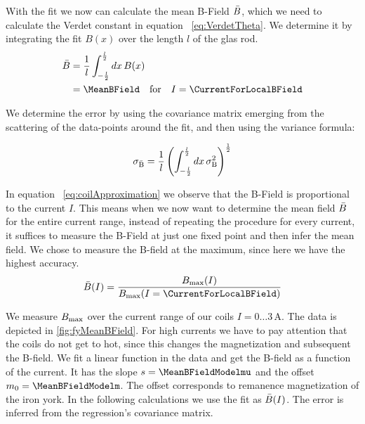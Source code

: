 \documentclass[a4paper,10pt,twocolumn]{article}
\newcommand{\unit}[1]{\, \mathrm{#1}}
\begin{document}
    \newcommand{\lHalf}{\frac{l}{2}}
    \newcommand{\xInteg}{\int_{-\lHalf}^{\lHalf} dx \,}

    With the fit we now can calculate the mean B-Field $\bar{B}$, which we need
    to calculate the Verdet constant in equation ~\eqref{eq:VerdetTheta}.
    We determine it by integrating the fit $B(x)$ over the length $l$ of the glas rod.
    \begin{align}
        \label{eq:meanBFieldInt}
        \BMean &= \frac{1}{l} \xInteg B(x) \\
            &= \MeanBField \quad \text{for} \quad I = \CurrentForLocalBField
    \end{align}

    We determine the error by using the covariance matrix emerging from the scattering of the
    data-points around the fit, and then using the variance formula:

    \begin{align*}
        \sigma_{\mathrm{\BMean}} = \frac{1}{l} \left( \xInteg \sigma_{\mathrm{B}}^2 \right)^{\frac{1}{2}}
    \end{align*}


    In equation ~\eqref{eq:coilApproximation} we observe that the B-Field is proportional to the
    current $I$.
    This means when we now want to determine the mean field $\bar{B}$ for the entire current range,
    instead of repeating the procedure for every current, it suffices to
    measure the B-Field at just one fixed point and then infer the mean field.
    We chose to measure the B-field at the maximum, since here we have the highest accuracy.
    \begin{align}
        \label{eq:meanBFromMaxB}
        \BMean (I) = \frac{\BMax(I)}{\BMax( I = \CurrentForLocalBField)}
    \end{align}

    We measure $B_{\mathrm{max}}$ over the current range of our coils $I = 0 \dots 3 \unit{A}$.
    The data is depicted in \autoref{fig:fyMeanBField}.
    For high currents we have to pay attention that the coils do not get to hot, since this changes
    the magnetization and subsequent the B-field.
    We fit a linear function in the data and get the B-field as a function of the current.
    It has the slope $s = \MeanBFieldModelmu$ and the offset $m_0 = \MeanBFieldModelm$.
    The offset corresponds to remanence magnetization of the iron york.
    In the following calculations we use the fit as $\bar{B}(I)$.
    The error is inferred from the regression's covariance matrix.
    
\end{document}
